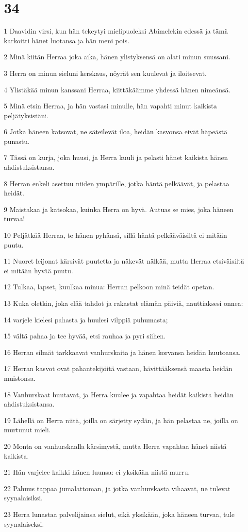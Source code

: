 \chapter{34}

\par 1 Daavidin virsi, kun hän tekeytyi mielipuoleksi Abimelekin edessä ja tämä karkoitti hänet luotansa ja hän meni pois.
\par 2 Minä kiitän Herraa joka aika, hänen ylistyksensä on alati minun suussani.
\par 3 Herra on minun sieluni kerskaus, nöyrät sen kuulevat ja iloitsevat.
\par 4 Ylistäkää minun kanssani Herraa, kiittäkäämme yhdessä hänen nimeänsä.
\par 5 Minä etsin Herraa, ja hän vastasi minulle, hän vapahti minut kaikista peljätyksistäni.
\par 6 Jotka häneen katsovat, ne säteilevät iloa, heidän kasvonsa eivät häpeästä punastu.
\par 7 Tässä on kurja, joka huusi, ja Herra kuuli ja pelasti hänet kaikista hänen ahdistuksistansa.
\par 8 Herran enkeli asettuu niiden ympärille, jotka häntä pelkäävät, ja pelastaa heidät.
\par 9 Maistakaa ja katsokaa, kuinka Herra on hyvä. Autuas se mies, joka häneen turvaa!
\par 10 Peljätkää Herraa, te hänen pyhänsä, sillä häntä pelkääväisiltä ei mitään puutu.
\par 11 Nuoret leijonat kärsivät puutetta ja näkevät nälkää, mutta Herraa etsiväisiltä ei mitään hyvää puutu.
\par 12 Tulkaa, lapset, kuulkaa minua: Herran pelkoon minä teidät opetan.
\par 13 Kuka oletkin, joka elää tahdot ja rakastat elämän päiviä, nauttiaksesi onnea:
\par 14 varjele kielesi pahasta ja huulesi vilppiä puhumasta;
\par 15 vältä pahaa ja tee hyvää, etsi rauhaa ja pyri siihen.
\par 16 Herran silmät tarkkaavat vanhurskaita ja hänen korvansa heidän huutoansa.
\par 17 Herran kasvot ovat pahantekijöitä vastaan, hävittääksensä maasta heidän muistonsa.
\par 18 Vanhurskaat huutavat, ja Herra kuulee ja vapahtaa heidät kaikista heidän ahdistuksistansa.
\par 19 Lähellä on Herra niitä, joilla on särjetty sydän, ja hän pelastaa ne, joilla on murtunut mieli.
\par 20 Monta on vanhurskaalla kärsimystä, mutta Herra vapahtaa hänet niistä kaikista.
\par 21 Hän varjelee kaikki hänen luunsa: ei yksikään niistä murru.
\par 22 Pahuus tappaa jumalattoman, ja jotka vanhurskasta vihaavat, ne tulevat syynalaisiksi.
\par 23 Herra lunastaa palvelijainsa sielut, eikä yksikään, joka häneen turvaa, tule syynalaiseksi.

